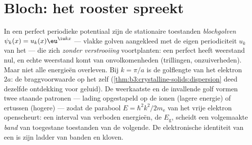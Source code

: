 \section{Bloch: het rooster spreekt}

\begin{theorem}\label{thm:b3:electrons-in-solids:bloch}
In een perfect periodieke potentiaal zijn de stationaire toestanden
\emph{blochgolven} $\psi_k(x) = u_k(x)\eu^{\iu kx}$ ---
vlakke golven aangekleed met de eigen periodiciteit $u_k$ van het  ---
die zich \emph{zonder verstrooiing} voortplanten: een perfect  heeft
weerstand nul, en echte weerstand komt van onvolkomenheden
(trillingen, onzuiverheden). Maar niet alle energieën overleven. Bij
$k = \pi/a$ is de golflengte van het elektron $2a$: de braggvoorwaarde
op het  zelf (\cref{thm:b3:crystalline-solids:dispersion}
deed dezelfde ontdekking voor geluid). De weerkaatste en de invallende
golf vormen twee staande patronen --- lading opgestapeld op de ionen
(lagere energie) of ertussen (hogere) --- zodat de parabool
$E = \hbar^2k^2/2m_{\text{e}}$ van het vrije elektron openscheurt: een interval van
verboden energieën, de \emph{} $E_{\text{g}}$, scheidt
een volgemaakte \emph{band} van toegestane toestanden van de volgende. De
elektronische identiteit van een  is zijn ladder van banden en kloven.
\end{theorem}
\admitted

